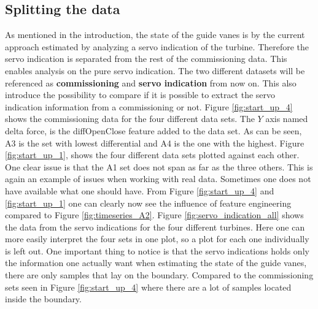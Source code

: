     \subsection{Splitting the data}
        As mentioned in the introduction, the state of the guide vanes is by the current approach estimated by analyzing a servo indication of the turbine. Therefore the servo indication is separated from the rest of the commissioning data. This enables analysis on the pure servo indication. The two different datasets will be referenced as \textbf{commissioning} and \textbf{servo indication} from now on. This also introduce the possibility to compare if it is possible to extract the servo indication information from a commissioning or not. Figure \ref{fig:start_up_4} shows the commissioning data for the four different data sets. The $Y$ axis named delta force, is the diffOpenClose feature added to the data set. As can be seen, A3 is the set with lowest differential and A4 is the one with the highest. Figure \ref{fig:start_up_1}, shows the four different data sets plotted against each other. One clear issue is that the A1 set does not span as far as the three others. This is again an example of issues when working with real data. Sometimes one does not have available what one should have. From Figure \ref{fig:start_up_4} and \ref{fig:start_up_1} one can clearly now see the influence of feature engineering compared to Figure \ref{fig:timeseries_A2}. Figure \ref{fig:servo_indication_all} shows the data from the servo indications for the four different turbines. Here one can more easily interpret the four sets in one plot, so a plot for each one individually is left out. One important thing to notice is that the servo indications holds only the information one actually want when estimating the state of the guide vanes, there are only samples that lay on the boundary. Compared to the commissioning sets seen in Figure \ref{fig:start_up_4} where there are a lot of samples located inside the boundary. 
        
